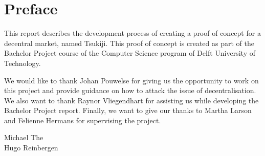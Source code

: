 \section{Preface}
This report describes the development process of creating a proof of concept for a decentral market, named Tsukiji. 
This proof of concept is created as part of the Bachelor Project course of the Computer Science program of Delft University of Technology.

We would like to thank Johan Pouwelse for giving us the opportunity to work on this project and provide guidance on how to attack the issue of decentralisation.
We also want to thank Raynor Vliegendhart for assisting us while developing the Bachelor Project report.
Finally, we want to give our thanks to Martha Larson and Felienne Hermans for supervising the project.

\begin{flushright}
Michael The \\
Hugo Reinbergen
\end{flushright}